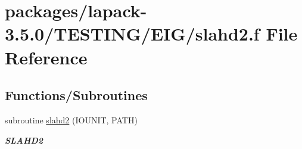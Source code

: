 \hypertarget{slahd2_8f}{}\section{packages/lapack-\/3.5.0/\+T\+E\+S\+T\+I\+N\+G/\+E\+I\+G/slahd2.f File Reference}
\label{slahd2_8f}
\subsection*{Functions/\+Subroutines}
\begin{DoxyCompactItemize}
\item 
subroutine \hyperlink{group__single__eig_gaed2b768a1738ac80fc4df77690614cd9}{slahd2} (I\+O\+U\+N\+I\+T, P\+A\+T\+H)
\begin{DoxyCompactList}\small\item\em {\bfseries S\+L\+A\+H\+D2} \end{DoxyCompactList}\end{DoxyCompactItemize}
